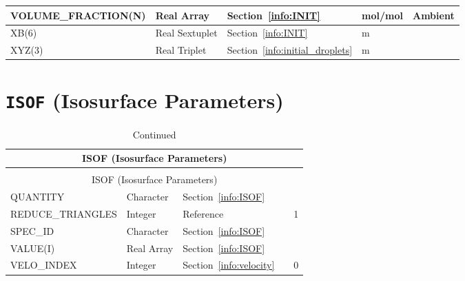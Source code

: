 \documentclass[11pt]{book}
\begin{document}
\begin{longtable}{@{\extracolsep{\fill}}|l|l|l|l|l|}
{\ct VOLUME\_FRACTION(N)}         & Real Array        & Section~\ref{info:INIT}                       & mol/mol        & Ambient       \\ \hline
{\ct XB(6)}                       & Real Sextuplet    & Section~\ref{info:INIT}                       & m              &               \\ \hline
{\ct XYZ(3)}                      & Real Triplet      & Section~\ref{info:initial_droplets}           & m              &               \\ \hline
\end{longtable}


\vspace{\baselineskip}



\section{\texorpdfstring{{\tt ISOF}}{ISOF} (Isosurface Parameters)}


\begin{longtable}{@{\extracolsep{\fill}}|l|l|l|l|l|}
\caption[Isosurface parameters ({\ct ISOF} namelist group)]{For more information see Section~\ref{info:ISOF}.}
\label{tbl:ISOF} \\
\hline
\multicolumn{5}{|c|}{{\ct ISOF} (Isosurface Parameters)} \\
\hline \hline
\endfirsthead
\caption[]{Continued} \\
\hline
\multicolumn{5}{|c|}{{\ct ISOF} (Isosurface Parameters)} \\
\hline \hline
\endhead
{\ct QUANTITY}              & Character     & Section~\ref{info:ISOF}                   &       &         \\ \hline
{\ct REDUCE\_TRIANGLES}     & Integer       & Reference~\cite{Smokeview_Users_Guide}    &       & 1       \\ \hline
{\ct SPEC\_ID}              & Character     & Section~\ref{info:ISOF}                   &       &         \\ \hline
{\ct VALUE(I)}              & Real Array    & Section~\ref{info:ISOF}                   &       &         \\ \hline
{\ct VELO\_INDEX}           & Integer       & Section~\ref{info:velocity}               &       &  0      \\ \hline
\end{longtable}


\vspace{\baselineskip}
\end{document}
